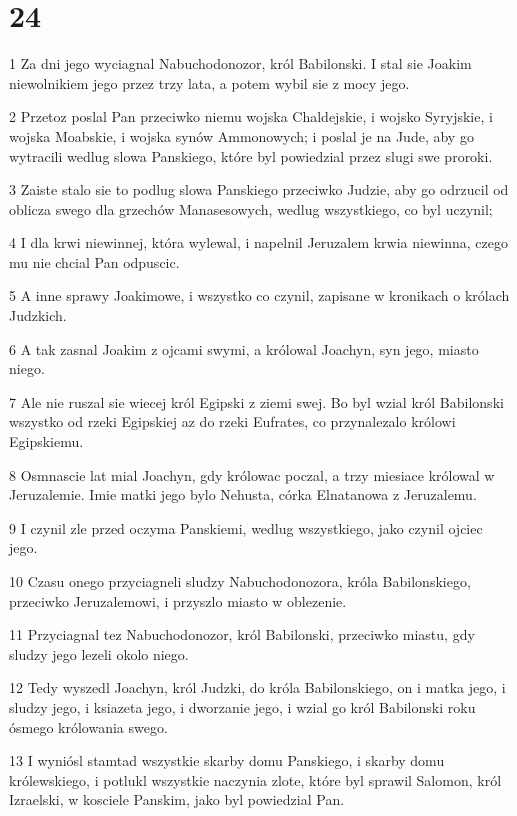 \chapter{24}

\par 1 Za dni jego wyciagnal Nabuchodonozor, król Babilonski. I stal sie Joakim niewolnikiem jego przez trzy lata, a potem wybil sie z mocy jego.
\par 2 Przetoz poslal Pan przeciwko niemu wojska Chaldejskie, i wojsko Syryjskie, i wojska Moabskie, i wojska synów Ammonowych; i poslal je na Jude, aby go wytracili wedlug slowa Panskiego, które byl powiedzial przez slugi swe proroki.
\par 3 Zaiste stalo sie to podlug slowa Panskiego przeciwko Judzie, aby go odrzucil od oblicza swego dla grzechów Manasesowych, wedlug wszystkiego, co byl uczynil;
\par 4 I dla krwi niewinnej, która wylewal, i napelnil Jeruzalem krwia niewinna, czego mu nie chcial Pan odpuscic.
\par 5 A inne sprawy Joakimowe, i wszystko co czynil, zapisane w kronikach o królach Judzkich.
\par 6 A tak zasnal Joakim z ojcami swymi, a królowal Joachyn, syn jego, miasto niego.
\par 7 Ale nie ruszal sie wiecej król Egipski z ziemi swej. Bo byl wzial król Babilonski wszystko od rzeki Egipskiej az do rzeki Eufrates, co przynalezalo królowi Egipskiemu.
\par 8 Osmnascie lat mial Joachyn, gdy królowac poczal, a trzy miesiace królowal w Jeruzalemie. Imie matki jego bylo Nehusta, córka Elnatanowa z Jeruzalemu.
\par 9 I czynil zle przed oczyma Panskiemi, wedlug wszystkiego, jako czynil ojciec jego.
\par 10 Czasu onego przyciagneli sludzy Nabuchodonozora, króla Babilonskiego, przeciwko Jeruzalemowi, i przyszlo miasto w oblezenie.
\par 11 Przyciagnal tez Nabuchodonozor, król Babilonski, przeciwko miastu, gdy sludzy jego lezeli okolo niego.
\par 12 Tedy wyszedl Joachyn, król Judzki, do króla Babilonskiego, on i matka jego, i sludzy jego, i ksiazeta jego, i dworzanie jego, i wzial go król Babilonski roku ósmego królowania swego.
\par 13 I wyniósl stamtad wszystkie skarby domu Panskiego, i skarby domu królewskiego, i potlukl wszystkie naczynia zlote, które byl sprawil Salomon, król Izraelski, w kosciele Panskim, jako byl powiedzial Pan.
